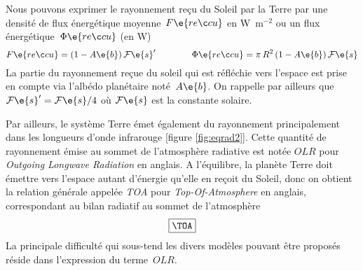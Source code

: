 \sk
Nous pouvons exprimer le rayonnement reçu du Soleil par la Terre par une densité de flux énergétique moyenne~$F\e{reçu}$ en W~m$^{-2}$ ou un flux énergétique~$\Phi\e{reçu}$ (en W)
\[ 
F\e{reçu} = (1-A\e{b}) \, \mathcal{F}\e{s}' 
\qquad \qquad
\Phi\e{reçu} = \pi \, R^2 \, (1-A\e{b}) \, \mathcal{F}\e{s}
\] 
La partie du rayonnement reçue du soleil qui est réfléchie vers l'espace est prise en compte via l'albédo planétaire noté~$A\e{b}$. On rappelle par ailleurs que~$\mathcal{F}\e{s}' = \mathcal{F}\e{s} / 4$ où $\mathcal{F}\e{s}$ est la constante solaire.


\sk
Par ailleurs, le système Terre émet également du rayonnement principalement dans les longueurs d'onde infrarouge [figure \ref{fig:eqrad2}]. 
Cette quantité de rayonnement émise au sommet de l'atmosphère radiative est notée $OLR$ pour \emph{Outgoing Longwave Radiation} en anglais.
A l'équilibre, la planète Terre doit émettre vers l'espace autant d'énergie qu'elle en reçoit du Soleil, donc
on obtient la relation générale appelée \emph{TOA} pour \emph{Top-Of-Atmosphere} en anglais, correspondant
au bilan radiatif au sommet de l'atmosphère
\[ \boxed{\TOA} \] 
La principale difficulté qui sous-tend les divers modèles pouvant être proposés réside dans l'expression du terme~$OLR$.


